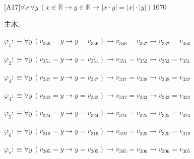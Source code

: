 \begin{fullproof}{[A17]}{$\forall x\,\forall y\,(x \in \mathbb{R} \to y \in \mathbb{R} \to \lvert x \cdot y \rvert = \lvert x \rvert \cdot \lvert y \rvert)$}{1070}
\begin{ptree}
\noLine
{}
\end{ptree}
\noindent 主木:
\begin{ptree}
\noLine
{}
\noLine
{}
\noLine
{}
\noLine
{}
\end{ptree}
\begin{abbrevlist}
\item $\varphi_{1} :\equiv \forall y\,(v_{356} = y \to y = v_{356}) \to v_{356} = v_{357} \to v_{357} = v_{356}$
\item $\varphi_{2} :\equiv \forall y\,(v_{351} = y \to y = v_{351}) \to v_{351} = v_{352} \to v_{352} = v_{351}$
\item $\varphi_{3} :\equiv \forall y\,(v_{337} = y \to y = v_{337}) \to v_{337} = v_{338} \to v_{338} = v_{337}$
\item $\varphi_{4} :\equiv \forall y\,(v_{332} = y \to y = v_{332}) \to v_{332} = v_{333} \to v_{333} = v_{332}$
\item $\varphi_{5} :\equiv \forall y\,(v_{324} = y \to y = v_{324}) \to v_{324} = v_{325} \to v_{325} = v_{324}$
\item $\varphi_{6} :\equiv \forall y\,(v_{319} = y \to y = v_{319}) \to v_{319} = v_{320} \to v_{320} = v_{319}$
\item $\varphi_{7} :\equiv \forall y\,(v_{305} = y \to y = v_{305}) \to v_{305} = v_{306} \to v_{306} = v_{305}$

\end{abbrevlist}
\end{fullproof}
